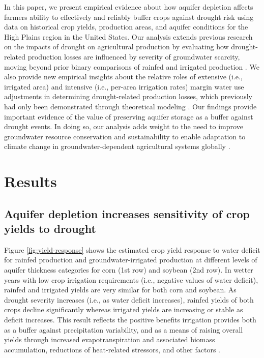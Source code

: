 \documentclass[
]{article}
\begin{document}
In this paper, we present empirical evidence about how aquifer depletion affects farmers ability to effectively and reliably buffer crops against drought risk using data on historical crop yields, production areas, and aquifer conditions for the High Plains region in the United States. Our analysis extends previous research on the impacts of drought on agricultural production by evaluating how drought-related production losses are influenced by severity of groundwater scarcity, moving beyond prior binary comparisons of rainfed and irrigated production \citep{schlenker2009nonlinear, lobell2014greater,lu2018crop}. We also provide new empirical insights about the relative roles of extensive (i.e., irrigated area) and intensive (i.e., per-area irrigation rates) margin water use adjustments in determining drought-related production losses, which previously had only been demonstrated through theoretical modeling \citep{foster2014modeling,foster2017effects,rad2020effects}. Our findings provide important evidence of the value of preserving aquifer storage as a buffer against drought events. In doing so, our analysis adds weight to the need to improve groundwater resource conservation and sustainability to enable adaptation to climate change in groundwater-dependent agricultural systems globally \citep{jain2021groundwater,scanlon2023global}. 



\hypertarget{results}{%
\section{Results}\label{results}}

\hypertarget{the-impact-of-drought-on-rainfed-and-irrigated-yield}{%
\subsection{Aquifer depletion increases sensitivity of crop yields to drought}\label{the-impact-of-drought-on-rainfed-and-irrigated-yield}}

Figure \ref{fig:yield-response} shows the estimated crop yield response to water deficit for rainfed production and groundwater-irrigated production at different levels of aquifer thickness categories for corn (1st row) and soybean (2nd row). In wetter years with low crop irrigation requirements (i.e., negative values of water deficit), rainfed and irrigated yields are very similar for both corn and soybean. As drought severity increases (i.e., as water deficit increases), rainfed yields of both crops decline significantly whereas irrigated yields are increasing or stable as deficit increases. This result reflects the positive benefits irrigation provides both as a buffer against precipitation variability, and as a means of raising overall yields through increased evapotranspiration and associated biomass accumulation, reductions of heat-related stressors, and other factors \citep{zhu2022untangling,li2020quantifying}.
\end{document}
